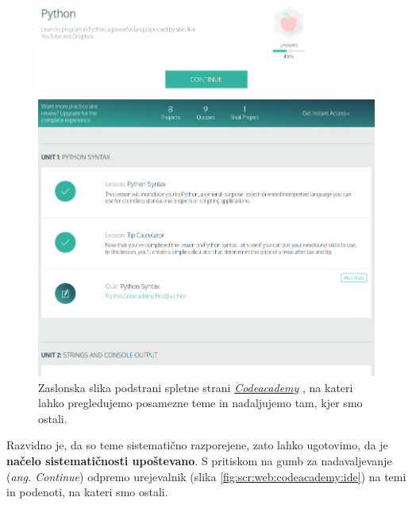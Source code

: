 
\begin{figure}[h!]
  \centering
    \includegraphics [width=0.65\linewidth, keepaspectratio =
    1] {./images/sc_web/codeacademy_tema_01.jpg}
%  
  \caption{Zaslonska slika podstrani spletne strani
      \emph{\href{https://www.codecademy.com/}{Codeacademy}}
      \cite{web:codeacademy}, na kateri lahko pregledujemo posamezne
      teme in nadaljujemo tam, kjer smo ostali.}
    \label{fig:scr:web:codeacademy:tema}
\end{figure}

Razvidno je, da so teme sistematično razporejene, zato lahko ugotovimo,
da je \textbf{načelo sistematičnosti upoštevano}. S pritiskom na gumb
za nadavaljevanje (\emph{ang. Continue}) odpremo urejevalnik (slika
\ref{fig:scr:web:codeacademy:ide}) na temi in podenoti, na kateri smo
ostali.

